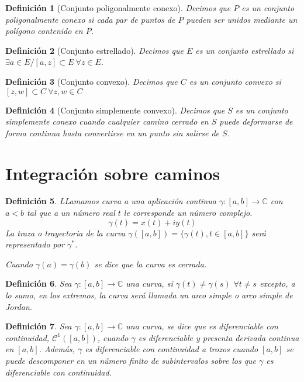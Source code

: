 \documentclass[10pt]{book}
\newtheorem{defi}{Definición}[chapter]
\newcommand{\C}{\mathbb{C}}
\begin{document}
\begin{defi}[Conjunto poligonalmente conexo]
Decimos que $P$ es un conjunto poligonalmente conexo si cada par de puntos  de $P$ pueden ser unidos mediante un polígono contenido en $P$.
\end{defi}

\begin{defi}[Conjunto estrellado]
Decimos que $E$ es un conjunto estrellado si $\exists a\in E / [a,z]\subset E\ \forall z \in E$.
\end{defi}

\begin{defi}[Conjunto convexo]
Decimos que $C$ es un conjunto convexo si $[z,w]\subset C\ \forall z,w \in C$
\end{defi}

\begin{defi}[Conjunto simplemente convexo]
Decimos que $S$ es un conjunto simplemente conexo cuando cualquier camino cerrado en $S$ puede deformarse de forma continua hasta convertirse en un punto sin salirse de $S$.
\end{defi}

\section{Integración sobre caminos}

\begin{defi}
LLamamos curva a una aplicación continua $\gamma: [a,b] \longrightarrow \C$ con $a<b$ tal que a un número real $t$ le corresponde un número complejo.
$$\gamma(t) = x(t) + iy(t)$$
La traza o trayectoria de la curva $\gamma([a,b]) = \{\gamma(t), t\in[a,b]\}$ será representado por $\gamma^*$.

Cuando $\gamma(a) = \gamma(b)$ se dice que la curva es cerrada.
\end{defi}

\begin{defi}
Sea $\gamma:[a,b]\longrightarrow \C$ una curva, si $\gamma(t) \neq \gamma(s) $ $\forall t\neq s$ excepto, a lo sumo, en los extremos, la curva será llamada un arco simple o arco simple de Jordan.
\end{defi}

\begin{defi}
Sea $\gamma:[a,b]\longrightarrow \C$ una curva, se dice que es diferenciable con continuidad, $\mathcal{C}^1([a,b])$, cuando $\gamma$ es diferenciable y presenta derivada continua en $[a,b]$. Además, $\gamma$ es diferenciable con continuidad a trozos cuando $[a,b]$ se puede descomponer en un número finito de subintervalos sobre los que $\gamma$ es diferenciable con continuidad.
\end{defi}
\end{document}
